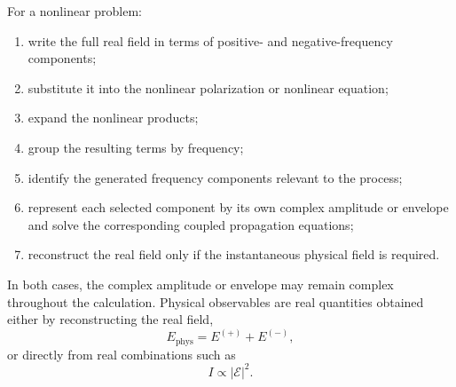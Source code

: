 \documentclass[11pt]{article}
\begin{document}
For a nonlinear problem:

\begin{enumerate}
    \item write the full real field in terms of positive- and negative-frequency components;
    \item substitute it into the nonlinear polarization or nonlinear equation;
    \item expand the nonlinear products;
    \item group the resulting terms by frequency;
    \item identify the generated frequency components relevant to the process;
    \item represent each selected component by its own complex amplitude or envelope and solve the corresponding coupled propagation equations;
    \item reconstruct the real field only if the instantaneous physical field is required.
\end{enumerate}

In both cases, the complex amplitude or envelope may remain complex throughout the calculation.  Physical observables are real quantities obtained either by reconstructing the real field,
\begin{equation}
E_{\mathrm{phys}}
=
E^{(+)}+E^{(-)},
\end{equation}
or directly from real combinations such as
\begin{equation}
I
\propto
|\mathcal{E}|^2.
\end{equation}
\end{document}
